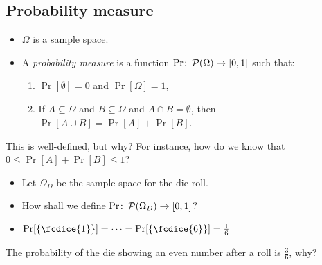 \subsection{Probability measure}

\begin{frame}
  \begin{definition}
    \begin{itemize}
      \item \(\Omega\) is a sample space.
      \item A \emph{probability measure} is a function \(\Pr\colon 
          \operatorname{\mathcal{P}}(\Omega)\to [0,1]\) such that:
        \begin{enumerate}
          \item \(\Pr[ \emptyset ] = 0\) and \(\Pr[ \Omega ] = 1\),
          \item If \(A\subseteq \Omega\) and \(B\subseteq \Omega\) and \(A\cap 
              B = \emptyset\), then \(\Pr[A\cup B] = \Pr[A] + \Pr[B]\).
        \end{enumerate}
    \end{itemize}
  \end{definition}

  \begin{exercise}
    This is well-defined, but why?
    For instance, how do we know that \(0\leq \Pr[A] + \Pr[B]\leq 1\)?
  \end{exercise}
\end{frame}

\begin{frame}
  \begin{example}
    \begin{itemize}
      \item Let \(\Omega_D\) be the sample space for the die roll.
      \item How shall we define \(\Pr\colon \operatorname{\mathcal{P}}(\Omega_D)\to [0, 1]\)?

        \pause{}

      \item \(\Pr[\{\fcdice{1}\}] = \cdots = \Pr[\{\fcdice{6}\}] 
          = \frac{1}{6}\)
    \end{itemize}
  \end{example}

  \pause{}

  \begin{exercise}
    The probability of the die showing an even number after a roll is 
    \(\frac{3}{6}\), why?
  \end{exercise}
\end{frame}

